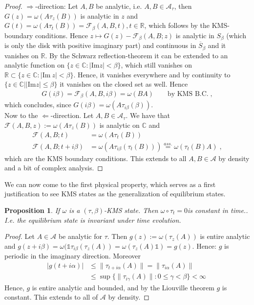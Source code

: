 \documentclass[
a4paper, %
11pt, %
onecolumn, %
openany, %
]{memoir}
\theoremstyle{definition}
\theoremstyle{remark}
\theoremstyle{plain}
\newtheorem{prop}{Proposition}[chapter]
\begin{document}
\begin{proof}
	$\Rightarrow$-direction: Let $A,B$ be analytic, i.e. $A,B\in\mathcal{A}_{\tau}$, then  $G(z)=\omega(A\tau_z(B))$ is analytic in $z$ and $G(t)=\omega(A\tau_t(B))=\mathcal{F}_{\beta}(A,B,t),t\in\mathbb{R}$, which follows by the KMS-boundary conditions. Hence $z\mapsto G(z)-\mathcal{F}_{\beta}(A,B;z)$ is analytic in $S_{\beta}$ (which is only the disk with positive imaginary part) and continuous in $\overline{S}_{\beta}$ and it vanishes on $\mathbb{R}$. By the Schwarz reflection-theorem it can be extended to an analytic function on $\{z\in\mathbb{C}:|\mathrm{Im}z|<\beta\}$, which still vanishes on $\mathbb{R}\subset \{z\in\mathbb{C}:|\mathrm{Im}~z|<\beta\}$. Hence, it vanishes everywhere and by continuity to $\{z\in\mathbb{C}||\mathrm{Im}z|\leq \beta\}$ it vanishes on the closed set as well. Hence \begin{align}
	G(i\beta)=\mathcal{F}_{\beta}(A,B,i\beta)=\omega(BA) \qquad \text{by KMS B.C.}\;,
	\end{align}
	which concludes, since $G(i\beta)=\omega(A\tau_{i\beta}(\beta))$.\\Now to the $\Leftarrow$-direction. Let $A,B\in\mathcal{A}_{\tau}$. We have that $\mathcal{F}(A,B,z):=\omega(A\tau_z(B))$ is analytic on $\mathbb{C}$ and \begin{align}
	\mathcal{F}(A,B;t)&=\omega(A\tau_t(B))\\
	\mathcal{F}(A,B;t+i\beta)&=\omega(A\tau_{i\beta}(\tau_t(B)))\overset{ass.}{=}\omega(\tau_t(B)A)\; ,
	\end{align}
which are the KMS boundary conditions. This extends to all $A,B\in\mathcal{A}$ by density and a bit of complex analysis.\end{proof}
We can now come to the first physical property, which serves as a first justification to see KMS states as the generalization of equilibrium states. \begin{prop}
	If $\omega$ is a $(\tau,\beta)$-KMS state. Then $\omega\circ \tau_t=0$is constant in time.. I.e. the equilibrium state is invariant under time evolution.
\end{prop}
\begin{proof}
	Let $A\in\mathcal{A}$ be analytic for $\tau$. Then $g(z):=\omega(\tau_z(A))$ is entire analytic and $g(z+i\beta)=\omega(\mathds{1}\tau_{i\beta}(\tau_z(A))=\omega(\tau_z(A)\mathds{1})=g(z)$. Hence: $g$ is periodic in the imaginary direction. Moreover \begin{align}
	|g(t+i\alpha)|&\leq \|\tau_{t+i\alpha}(A)\|=\|\tau_{i\alpha}(A)\| \\
	&\leq \sup\{\|\tau_{i\gamma}(A)\|:0\leq \gamma <\beta\} < \infty\; 
	\end{align}
	Hence, $g$ is entire analytic and bounded, and by the Liouville theorem $g$ is constant. This extends to all of $\mathcal{A}$ by density.
\end{proof}
\end{document}

